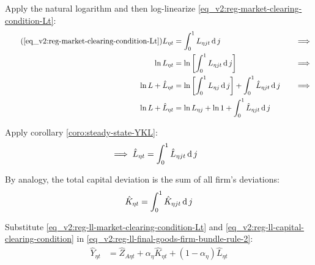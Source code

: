 \documentclass[../thesis.tex]{subfiles}
\begin{document}
Apply the natural logarithm and then log-linearize \ref{eq_v2:reg-market-clearing-condition-Lt}:
\begin{alignat}{2}
	\tag{\ref{eq_v2:reg-market-clearing-condition-Lt}}
	L_{\eta t} &= \int_{0}^{1} L_{\eta jt} \dif j &\implies \\
	\ln L_{\eta t} &= \ln \left[ \int_{0}^{1} L_{\eta jt} \dif j \right] &\implies \nonumber \\
	\ln L + \hat{L}_{\eta t} &= \ln \left[ \int_{0}^{1} L_{\eta j} \dif j \right] + \int_{0}^{1} \hat{L}_{\eta jt} \dif j \quad &\implies \nonumber \\
	\ln L + \hat{L}_{\eta t} &= \ln L_{\eta j} + \ln 1 + \int_{0}^{1} \hat{L}_{\eta jt} \dif j \nonumber
\end{alignat}

Apply corollary \ref{coro:steady-state-YKL}:
\begin{align}
	\implies \hat{L}_{\eta t} &= \int_{0}^{1} \hat{L}_{\eta jt} \operatorname{d} j \label{eq_v2:reg-ll-market-clearing-condition-Lt}
\end{align}

	By analogy, the total capital deviation is the sum of all firm's deviations:
\begin{align}
	\hat{K}_{\eta t} = \int_{0}^{1} \hat{K}_{\eta jt} \operatorname{d} j \label{eq_v2:reg-ll-capital-clearing-condition}
\end{align}

Substitute \ref{eq_v2:reg-ll-market-clearing-condition-Lt} and \ref{eq_v2:reg-ll-capital-clearing-condition} in \ref{eq_v2:reg-ll-final-goods-firm-bundle-rule-2}:
\begin{align}
	\hat{Y}_{\eta t} &= \hat{Z}_{A\eta t} + {\alpha_{\eta}} \hat{K}_{\eta t} + (1-\alpha_{\eta}) \hat{L}_{\eta t} \label{eq_v2:reg-ll-final-goods-firm-bundle-rule-3}
\end{align}
\end{document}
